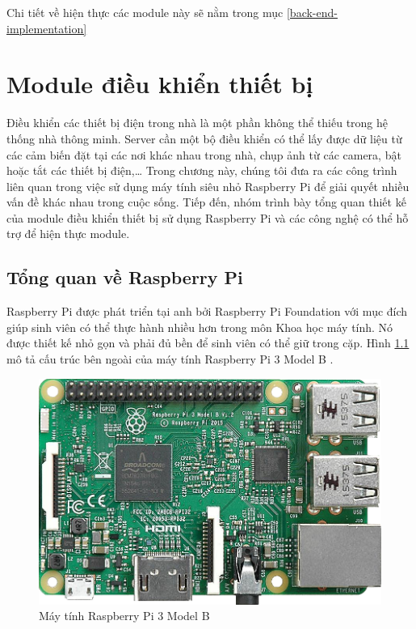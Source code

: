 \documentclass[12pt,a4paper,oneside]{extbook}
\begin{document}
Chi tiết về hiện thực các module này sẽ nằm trong mục \ref{back-end-implementation}

\chapter{Module điều khiển thiết bị}
Điều khiển các thiết bị điện trong nhà là một phần không thể thiếu trong hệ thống nhà thông minh. Server cần một bộ điều khiển có thể lấy được dữ liệu từ các cảm biến đặt tại các nơi khác nhau trong nhà, chụp ảnh từ các camera, bật hoặc tắt các thiết bị điện,\dots\hspace{0mm} Trong chương này, chúng tôi đưa ra các công trình liên quan trong việc sử dụng máy tính siêu nhỏ Raspberry Pi để giải quyết nhiều vấn đề khác nhau trong cuộc sống. Tiếp đến, nhóm trình bày tổng quan thiết kế của module điều khiển thiết bị sử dụng Raspberry Pi và các công nghệ có thể hỗ trợ để hiện thực module.

\section{Tổng quan về Raspberry Pi}
Raspberry Pi được phát triển tại anh bởi Raspberry Pi Foundation với mục đích giúp sinh viên có thể thực hành nhiều hơn trong môn Khoa học máy tính. Nó được thiết kế nhỏ gọn và phải đủ bền để sinh viên có thể giữ trong cặp. Hình \ref{fig:4-pi3-model-b} mô tả cấu trúc bên ngoài của máy tính Raspberry Pi 3 Model B \cite{pi-for-dummies}\cite{pi-wiki}.

\begin{figure}[h]
  \centering
     \includegraphics[scale=0.3]{4-pi3-model-b}
  \caption{Máy tính Raspberry Pi 3 Model B}\label{fig:4-pi3-model-b}
\end{figure}
\end{document}

